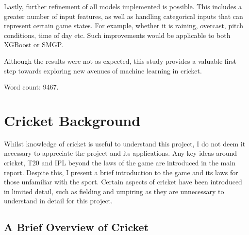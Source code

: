 \documentclass[12pt,a4paper]{report}
\theoremstyle{definition}
\begin{document}
Lastly, further refinement of all models implemented is possible. 
This includes a greater number of input features, as well as handling categorical inputs that can represent certain game states.
For example, whether it is raining, overcast, pitch conditions, time of day etc.
Such improvements would be applicable to both XGBoost or SMGP.

Although the results were not as expected, this study provides a valuable first step towards exploring new avenues of machine learning in cricket.

Word count: 9467.




\appendix


\chapter{Cricket Background} \label{chap:CrickBackground}

Whilst knowledge of cricket is useful to understand this project, I do not deem it necessary to appreciate the project and its applications.
Any key ideas around cricket, T20 and IPL beyond the laws of the game are introduced in the main report.
Despite this, I present a brief introduction to the game and its laws for those unfamiliar with the sport.
Certain aspects of cricket have been introduced in limited detail, such as fielding and umpiring as they are unnecessary to understand in detail for this project.

\section{A Brief Overview of Cricket}
\end{document}
